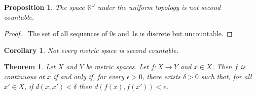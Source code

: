 \documentclass{report}
\let\qed\relax
\newtheorem{prop}[lm]{Proposition}
\newtheorem{thm}[lm]{Theorem}
\newtheorem{cor}{Corollary}[lm]
\theoremstyle{definition}
\begin{document}
   \begin{prop}
   The space $\mathbb{R}^\omega$ under the uniform topology is not second
countable.
 \end{prop}

 \begin{proof}
   \pf\ The set of all sequences of 0s and 1s is discrete but uncountable. \qed
 \end{proof}

\begin{cor}
  Not every metric space is second countable.
\end{cor}

  \begin{thm}
    \label{thm:topology:metric:continuous}
    Let $X$ and $Y$ be metric spaces. Let $f : X \rightarrow Y$ and $x \in X$.
    Then $f$ is continuous at $x$ if and only if, for every $\epsilon > 0$,
    there
    exists $\delta > 0$ such that, for all $x' \in X$, if $d(x, x') < \delta$
    then
    $d(f(x), f(x')) < \epsilon$.
  \end{thm}
\end{document}
